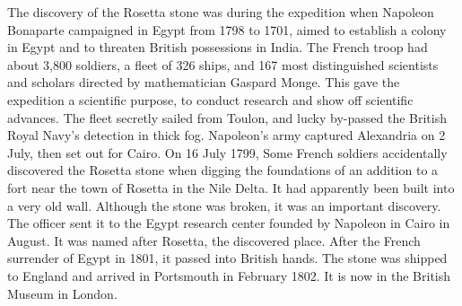 \documentclass[b5paper]{article}
\begin{document}
The discovery of the Rosetta stone was during the expedition when Napoleon Bonaparte campaigned in Egypt from 1798 to 1701, aimed to establish a colony in Egypt and to threaten British possessions in India. The French troop had about 3,800 soldiers, a fleet of 326 ships, and 167 most distinguished scientists and scholars directed by mathematician Gaspard Monge\cite{Harrison-2023}. This gave the expedition a scientific purpose, to conduct research and show off scientific advances. The fleet secretly sailed from Toulon, and lucky by-passed the British Royal Navy's detection in thick fog. Napoleon's army captured Alexandria on 2 July, then set out for Cairo. On 16 July 1799, Some French soldiers accidentally discovered the Rosetta stone when digging the foundations of an addition to a fort near the town of Rosetta in the Nile Delta. It had apparently been built into a very old wall. Although the stone was broken, it was an important discovery. The officer sent it to the Egypt research center founded by Napoleon in Cairo in August. It was named after Rosetta, the discovered place. After the French surrender of Egypt in 1801, it passed into British hands. The stone was shipped to England and arrived in Portsmouth in February 1802. It is now in the British Museum in London.
\end{document}
